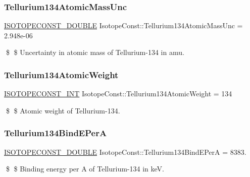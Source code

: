 \subsubsection{\texorpdfstring{Tellurium134\+Atomic\+Mass\+Unc}{Tellurium134AtomicMassUnc}}
{\footnotesize\ttfamily \mbox{\hyperlink{group___isotope_const-_macros_ga8f45a7272ce02c0b4c65c44636ed719a}{I\+S\+O\+T\+O\+P\+E\+C\+O\+N\+S\+T\+\_\+\+D\+O\+U\+B\+LE}} Isotope\+Const\+::\+Tellurium134\+Atomic\+Mass\+Unc = 2.\+948e-\/06}

\$ \$ Uncertainty in atomic mass of Tellurium-\/134 in amu. \mbox{\label{group___isotope_const-_tellurium-_te134_ga59f1ae4f5741e79de936951ab2f4ab9c}} 
\subsubsection{\texorpdfstring{Tellurium134\+Atomic\+Weight}{Tellurium134AtomicWeight}}
{\footnotesize\ttfamily \mbox{\hyperlink{group___isotope_const-_macros_ga5f18360b3e99483a35c32d789e62621c}{I\+S\+O\+T\+O\+P\+E\+C\+O\+N\+S\+T\+\_\+\+I\+NT}} Isotope\+Const\+::\+Tellurium134\+Atomic\+Weight = 134}

\$ \$ Atomic weight of Tellurium-\/134. \mbox{\label{group___isotope_const-_tellurium-_te134_gac5a674675515309794cad40f45ef8063}} 
\subsubsection{\texorpdfstring{Tellurium134\+Bind\+E\+PerA}{Tellurium134BindEPerA}}
{\footnotesize\ttfamily \mbox{\hyperlink{group___isotope_const-_macros_ga8f45a7272ce02c0b4c65c44636ed719a}{I\+S\+O\+T\+O\+P\+E\+C\+O\+N\+S\+T\+\_\+\+D\+O\+U\+B\+LE}} Isotope\+Const\+::\+Tellurium134\+Bind\+E\+PerA = 8383.}

\$ \$ Binding energy per A of Tellurium-\/134 in keV. \mbox{\label{group___isotope_const-_tellurium-_te134_gaa8f267539ad4679cb81058860f0d3d57}} 
